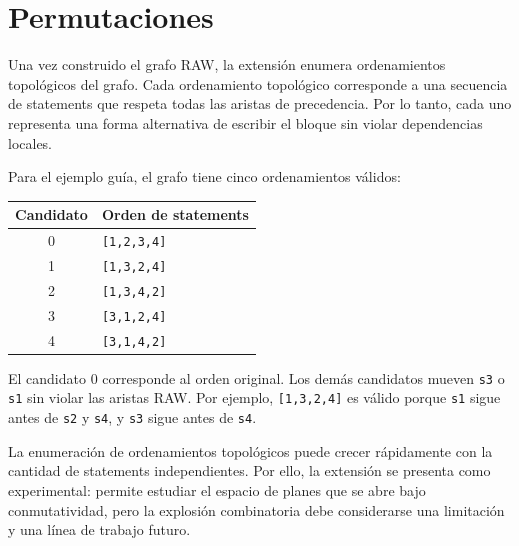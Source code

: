 
\section{Permutaciones}

Una vez construido el grafo RAW, la extensión enumera ordenamientos topológicos del grafo. Cada ordenamiento topológico corresponde a una secuencia de statements que respeta todas las aristas de precedencia. Por lo tanto, cada uno representa una forma alternativa de escribir el bloque sin violar dependencias locales.

Para el ejemplo guía, el grafo tiene cinco ordenamientos válidos:

\begin{center}
\begin{tabular}{cl}
\hline
Candidato & Orden de statements \\
\hline
0 & \texttt{[1,2,3,4]} \\
1 & \texttt{[1,3,2,4]} \\
2 & \texttt{[1,3,4,2]} \\
3 & \texttt{[3,1,2,4]} \\
4 & \texttt{[3,1,4,2]} \\
\hline
\end{tabular}
\end{center}

El candidato 0 corresponde al orden original. Los demás candidatos mueven \texttt{s3} o \texttt{s1} sin violar las aristas RAW. Por ejemplo, \texttt{[1,3,2,4]} es válido porque \texttt{s1} sigue antes de \texttt{s2} y \texttt{s4}, y \texttt{s3} sigue antes de \texttt{s4}.

La enumeración de ordenamientos topológicos puede crecer rápidamente con la cantidad de statements independientes. Por ello, la extensión se presenta como experimental: permite estudiar el espacio de planes que se abre bajo conmutatividad, pero la explosión combinatoria debe considerarse una limitación y una línea de trabajo futuro.
